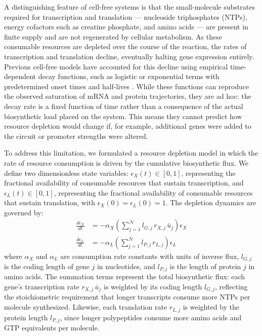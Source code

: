 A distinguishing feature of cell-free systems is that the small-molecule substrates required for transcription and translation --- nucleoside triphosphates (NTPs), energy cofactors such as creatine phosphate, and amino acids --- are present in finite supply and are not regenerated by cellular metabolism. As these consumable resources are depleted over the course of the reaction, the rates of transcription and translation decline, eventually halting gene expression entirely. Previous cell-free models have accounted for this decline using empirical time-dependent decay functions, such as logistic or exponential terms with predetermined onset times and half-lives \cite{karzbrun2011coarse,stogbauer2012experiment}. While these functions can reproduce the observed saturation of mRNA and protein trajectories, they are ad hoc: the decay rate is a fixed function of time rather than a consequence of the actual biosynthetic load placed on the system. This means they cannot predict how resource depletion would change if, for example, additional genes were added to the circuit or promoter strengths were altered.

To address this limitation, we formulated a resource depletion model in which the rate of resource consumption is driven by the cumulative biosynthetic flux. We define two dimensionless state variables: $\epsilon_X(t) \in [0,1]$, representing the fractional availability of consumable resources that sustain transcription, and $\epsilon_L(t) \in [0,1]$, representing the fractional availability of consumable resources that sustain translation, with $\epsilon_X(0) = \epsilon_L(0) = 1$. The depletion dynamics are governed by:
\begin{align}
\frac{d\epsilon_X}{dt} &= -\alpha_X\left(\sum_{j=1}^{\mathcal{N}} l_{G,j}\,r_{X,j}\,\bar{u}_j\right)\epsilon_X \label{eq:S-epsX} \\
\frac{d\epsilon_L}{dt} &= -\alpha_L\left(\sum_{j=1}^{\mathcal{N}} l_{P,j}\,r_{L,j}\right)\epsilon_L \label{eq:S-epsL}
\end{align}
where $\alpha_X$ and $\alpha_L$ are consumption rate constants with units of inverse flux, $l_{G,j}$ is the coding length of gene $j$ in nucleotides, and $l_{P,j}$ is the length of protein $j$ in amino acids. The summation terms represent the total biosynthetic flux: each gene's transcription rate $r_{X,j}\,\bar{u}_j$ is weighted by its coding length $l_{G,j}$, reflecting the stoichiometric requirement that longer transcripts consume more NTPs per molecule synthesized. Likewise, each translation rate $r_{L,j}$ is weighted by the protein length $l_{P,j}$, since longer polypeptides consume more amino acids and GTP equivalents per molecule.

